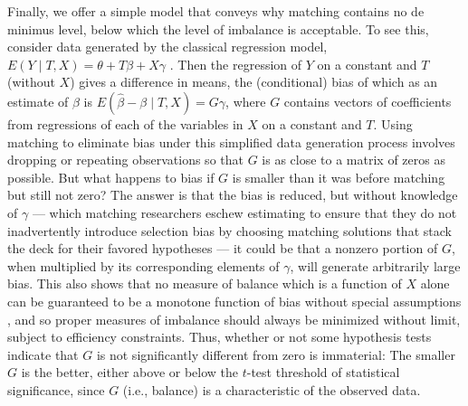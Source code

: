 \documentclass[11pt,titlepage]{article}
\begin{document}
Finally, we offer a simple model that conveys why matching contains no
de minimus level, below which the level of imbalance is acceptable.
To see this, consider data generated by the classical regression
model, $E(Y\mid T,X)= \theta + T\beta + X\gamma$ \citep{Goldberger91}.
Then the regression of $Y$ on a constant and $T$ (without $X$) gives a
difference in means, the (conditional) bias of which as an estimate of
$\beta$ is $E(\hat\beta-\beta\mid T,X) = G\gamma$, where $G$ contains
vectors of coefficients from regressions of each of the variables in
$X$ on a constant and $T$.  Using matching to eliminate bias under
this simplified data generation process involves dropping or repeating
observations so that $G$ is as close to a matrix of zeros as possible.
But what happens to bias if $G$ is smaller than it was before matching
but still not zero?  The answer is that the bias is reduced, but
without knowledge of $\gamma$ --- which matching researchers eschew
estimating to ensure that they do not inadvertently introduce
selection bias by choosing matching solutions that stack the deck for
their favored hypotheses --- it could be that a nonzero portion of
$G$, when multiplied by its corresponding elements of $\gamma$, will
generate arbitrarily large bias.  This also shows that no measure of
balance which is a function of $X$ alone can be guaranteed to be a
monotone function of bias without special assumptions
\citep{RubStu06}, and so proper measures of imbalance should always be
minimized without limit, subject to efficiency constraints.  Thus,
whether or not some hypothesis tests indicate that $G$ is not
significantly different from zero is immaterial: The smaller $G$ is
the better, either above or below the $t$-test threshold of
statistical significance, since $G$ (i.e., balance) is a
characteristic of the observed data.
\\
\end{document}
